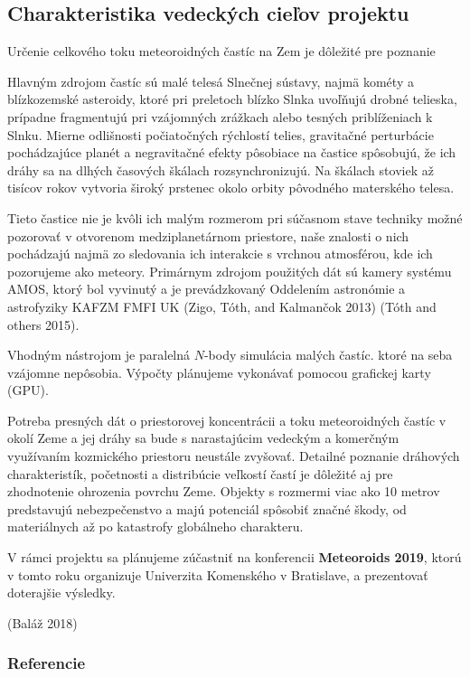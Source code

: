 \subsection{Charakteristika vedeckých cieľov
projektu}\label{charakteristika-vedeckuxfdch-cieux13eov-projektu}

Určenie celkového toku meteoroidných častíc na Zem je dôležité pre
poznanie

Hlavným zdrojom častíc sú malé telesá Slnečnej sústavy, najmä kométy a
blízkozemské asteroidy, ktoré pri preletoch blízko Slnka uvoľňujú drobné
telieska, prípadne fragmentujú pri vzájomných zrážkach alebo tesných
priblíženiach k Slnku. Mierne odlišnosti počiatočných rýchlostí telies,
gravitačné perturbácie pochádzajúce planét a negravitačné efekty
pôsobiace na častice spôsobujú, že ich dráhy sa na dlhých časových
škálach rozsynchronizujú. Na škálach stoviek až tisícov rokov vytvoria
široký prstenec okolo orbity pôvodného materského telesa.

Tieto častice nie je kvôli ich malým rozmerom pri súčasnom stave
techniky možné pozorovať v otvorenom medziplanetárnom priestore, naše
znalosti o nich pochádzajú najmä zo sledovania ich interakcie s vrchnou
atmosférou, kde ich pozorujeme ako meteory. Primárnym zdrojom použitých
dát sú kamery systému AMOS, ktorý bol vyvinutý a je prevádzkovaný
Oddelením astronómie a astrofyziky KAFZM FMFI UK (Zigo, Tóth, and
Kalmančok 2013) (Tóth and others 2015).

Vhodným nástrojom je paralelná \(N\)-body simulácia malých častíc. ktoré
na seba vzájomne nepôsobia. Výpočty plánujeme vykonávať pomocou
grafickej karty (GPU).

Potreba presných dát o priestorovej koncentrácii a toku meteoroidných
častíc v okolí Zeme a jej dráhy sa bude s narastajúcim vedeckým a
komerčným využívaním kozmického priestoru neustále zvyšovať. Detailné
poznanie dráhových charakteristík, početnosti a distribúcie veľkostí
častí je dôležité aj pre zhodnotenie ohrozenia povrchu Zeme. Objekty s
rozmermi viac ako 10 metrov predstavujú nebezpečenstvo a majú potenciál
spôsobiť značné škody, od materiálnych až po katastrofy globálneho
charakteru.

V rámci projektu sa plánujeme zúčastniť na konferencii
\textbf{Meteoroids 2019}, ktorú v tomto roku organizuje Univerzita
Komenského v Bratislave, a prezentovať doterajšie výsledky.

(Baláž 2018)

\subsubsection*{Referencie}\label{referencie}

